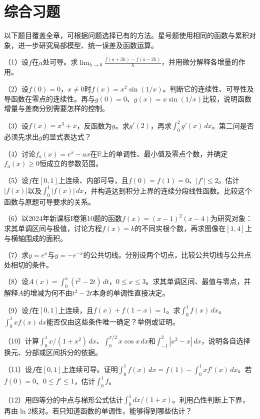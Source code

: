 \FloatBarrier
\newpage
\section{综合习题}
\label{sec:calculus-exercises}

以下题目覆盖全章，可根据问题选择已有的方法。星号题使用相同的函数与累积对象，进一步研究局部模型、统一误差及函数运算。

\begin{exercise}
\mbox{}\par\nobreak

（1）设\(f\)在\(a\)处可导。求\(\displaystyle\lim_{h\to0}\frac{f(a+3h)-f(a-2h)}h\)，并用微分解释各增量的作用。

（2）设\(f(0)=0\)，\(x\ne0\)时\(f(x)=x^2\sin(1/x)\)。判断它的连续性、可导性及导函数在零点的连续性。再与\(g(0)=0\)、\(g(x)=x\sin(1/x)\)比较，说明函数增量与差商分别需要怎样的控制。

（3）设\(f(x)=x^3+x\)，反函数为\(g\)。求\(g'(2)\)，再求\(\int_0^2g'(x)\,dx\)。第二问是否必须先求出\(g\)的显式表达式？

（4）讨论\(f_a(x)=e^x-ax\)在\(\mathbb R\)上的单调性、最小值及零点个数，并确定\(f_a(x)\ge0\)恒成立的参数范围。

（5）设\(f\)在\([0,1]\)上连续、内部可导，且\(f(0)=f(1)=0\)、\(|f'|\le2\)。估计\(|f(x)|\)以及\(\int_0^1|f(x)|\,dx\)，并构造达到积分上界的连续分段线性函数。比较这个函数与原题可导要求的关系。

（6）以2024年新课标I卷第10题的函数\(f(x)=(x-1)^2(x-4)\)为研究对象：求其单调区间与极值，讨论方程\(f(x)=k\)的不同实根个数，再求图像在\([1,4]\)上与横轴围成的面积。

（7）求\(y=e^x\)与\(y=-e^{-x}\)的公共切线。分别设两个切点，比较公共切线与公共点处相切的条件。

（8）设\(A(x)=\int_0^x(t^2-2t)\,dt\)，\(0\le x\le3\)。求其单调区间、最值与零点，并解释\(A\)的增减为何不由\(t^2-2t\)本身的单调性直接决定。

（9）设\(f\)在\([0,1]\)上连续，且\(f(x)+f(1-x)=1\)。求\(\int_0^1f(x)\,dx\)。\(\int_0^1xf(x)\,dx\)能否仅由这些条件唯一确定？举例或证明。

（10）计算\(\int_0^1 x/(1+x^2)\,dx\)、\(\int_0^{\pi/2}x\cos x\,dx\)和\(\int_{-1}^2|x^2-x|\,dx\)，说明各自选择换元、分部或区间拆分的依据。

（11）设\(f\)在\([0,1]\)上连续可导。证明\(\int_0^1f(x)\,dx=f(1)-\int_0^1xf'(x)\,dx\)。若\(f(0)=0\)、\(0\le f'\le1\)，估计\(\int_0^1 f\)。

（12）用四等分的中点与梯形公式估计\(\int_0^1dx/(1+x)\)。利用凸性判断上下界，再由\(\ln2\)核对。若只知道函数的单调性，能够得到哪些估计？


\end{exercise}
